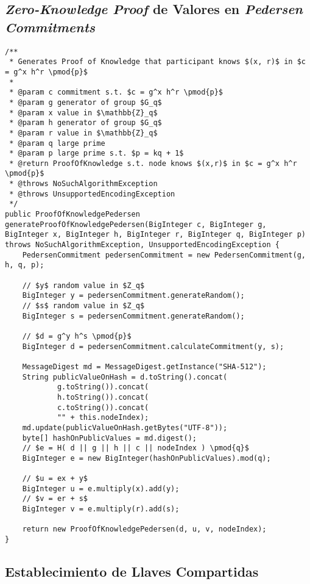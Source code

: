 \subsection{\emph{Zero-Knowledge Proof} de Valores en \emph{Pedersen Commitments}}

\begin{verbatim}
/**
 * Generates Proof of Knowledge that participant knows $(x, r)$ in $c = g^x h^r \pmod{p}$
 *
 * @param c commitment s.t. $c = g^x h^r \pmod{p}$
 * @param g generator of group $G_q$
 * @param x value in $\mathbb{Z}_q$
 * @param h generator of group $G_q$
 * @param r value in $\mathbb{Z}_q$
 * @param q large prime
 * @param p large prime s.t. $p = kq + 1$
 * @return ProofOfKnowledge s.t. node knows $(x,r)$ in $c = g^x h^r \pmod{p}$
 * @throws NoSuchAlgorithmException     
 * @throws UnsupportedEncodingException 
 */
public ProofOfKnowledgePedersen generateProofOfKnowledgePedersen(BigInteger c, BigInteger g, BigInteger x, BigInteger h, BigInteger r, BigInteger q, BigInteger p) throws NoSuchAlgorithmException, UnsupportedEncodingException {
    PedersenCommitment pedersenCommitment = new PedersenCommitment(g, h, q, p);

    // $y$ random value in $Z_q$
    BigInteger y = pedersenCommitment.generateRandom();
    // $s$ random value in $Z_q$ 
    BigInteger s = pedersenCommitment.generateRandom(); 

    // $d = g^y h^s \pmod{p}$
    BigInteger d = pedersenCommitment.calculateCommitment(y, s); 

    MessageDigest md = MessageDigest.getInstance("SHA-512");
    String publicValueOnHash = d.toString().concat(
            g.toString()).concat(
            h.toString()).concat(
            c.toString()).concat(
            "" + this.nodeIndex);
    md.update(publicValueOnHash.getBytes("UTF-8"));
    byte[] hashOnPublicValues = md.digest();
    // $e = H( d || g || h || c || nodeIndex ) \pmod{q}$
    BigInteger e = new BigInteger(hashOnPublicValues).mod(q); 

    // $u = ex + y$
    BigInteger u = e.multiply(x).add(y);
    // $v = er + s$ 
    BigInteger v = e.multiply(r).add(s);

    return new ProofOfKnowledgePedersen(d, u, v, nodeIndex);
}
\end{verbatim}

\subsection{Establecimiento de Llaves Compartidas}

